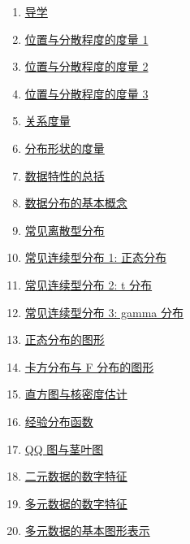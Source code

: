 \documentclass[11pt]{article}
\begin{document}
\begin{multicols}{2}
	\begin{enumerate}
		\item \href{https://mp.weixin.qq.com/s/z6Y1O0i_hpA1H6dxfXX6_A}{导学}	%
		\item \href{https://mp.weixin.qq.com/s/U_PFsLxov9d6ae7HIFcIgQ}{位置与分散程度的度量 1}	%
		\item \href{https://mp.weixin.qq.com/s/pJbunm0GCkA131ZER_U9Gg}{位置与分散程度的度量 2}	%
		\item \href{https://mp.weixin.qq.com/s/KgKaYDPtGjC7SzfdlCKusw}{位置与分散程度的度量 3}	%
		\item \href{https://mp.weixin.qq.com/s/1BLMnW-EvSUCjLLeZ2QScA}{关系度量}	%
		\item \href{https://mp.weixin.qq.com/s/o_FD-HvD15dMuK-WUSCdLg}{分布形状的度量}	%
		\item \href{https://mp.weixin.qq.com/s/xWGT0SrCcSOH1k4kiAWOOA}{数据特性的总括}	%
		\item \href{https://mp.weixin.qq.com/s/afp68LQTO4nqM6liN6N2nw}{数据分布的基本概念}	%
		\item \href{https://mp.weixin.qq.com/s/r2IcgyWzFJmOAW8dRn5L7g}{常见离散型分布}	%
		\item \href{https://mp.weixin.qq.com/s/ptueUbv_uMgY2TdkidCpdw}{常见连续型分布 1: 正态分布}	%
		\item \href{https://mp.weixin.qq.com/s/FcCn-W8Irf02Ski5gLEY4g}{常见连续型分布 2: t 分布}	%
		\item \href{https://mp.weixin.qq.com/s/a5LvPOWxfMKoswZ6WTVfvQ}{常见连续型分布 3: gamma 分布}	%
		\item \href{https://mp.weixin.qq.com/s/5zuagJgYC5N2GkE2ergBHg}{正态分布的图形}	%
		\item \href{https://mp.weixin.qq.com/s/UkeruyDb9DYbNTPgwP398g}{卡方分布与 F 分布的图形}	%
		\item \href{https://mp.weixin.qq.com/s/ve7ImOBw5AuPU_iaHwAHzA}{直方图与核密度估计}	%
		\item \href{https://mp.weixin.qq.com/s/yF0UyJKkxqTJX5Usk1lwOA}{经验分布函数}	%
		\item \href{https://mp.weixin.qq.com/s/vGE4-iXxtEhIgRl-gv4GMA}{QQ 图与茎叶图}	%
		\item \href{https://mp.weixin.qq.com/s/tnDQlPejHi3ocsc5pEG7og}{二元数据的数字特征}	%
		\item \href{https://mp.weixin.qq.com/s/m_QV4iK0cdl89XghqogYNA}{多元数据的数字特征}	%
		\item \href{https://mp.weixin.qq.com/s/iXuUYEIZYc3mdiO0Wj9kpw}{多元数据的基本图形表示}	%

\end{enumerate}
\end{multicols}
\end{document}
